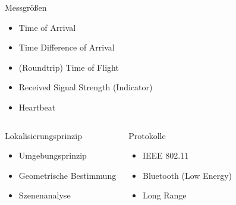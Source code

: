 \documentclass[18pt]{beamer}
\begin{document}
\begin{frame}
	\begin{block}{Messgrößen}
		\begin{itemize}
			\item Time of Arrival
			\item Time Difference of Arrival
			\item (Roundtrip) Time of Flight
			\item Received Signal Strength (Indicator) 
			\item Heartbeat
		\end{itemize}
	\end{block}  

	\begin{columns}
				\begin{block}{Lokalisierungsprinzip}
					\begin{itemize}
						\item Umgebungsprinzip
						\item Geometrische Bestimmung
						\item Szenenanalyse
					\end{itemize}
				\end{block} 

			\begin{block}{Protokolle}
				\begin{itemize}
					\item IEEE 802.11
					\item Bluetooth (Low Energy)
					\item Long Range
				\end{itemize}
			\end{block} 
	\end{columns}
\end{frame}
\end{document}
